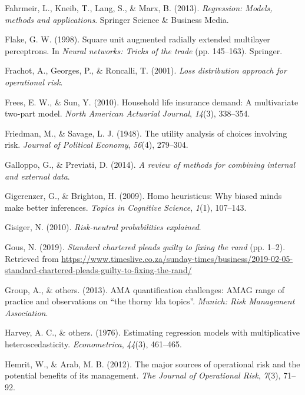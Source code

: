 \documentclass{DissertateUSU}
\begin{document}
\leavevmode\hypertarget{ref-fahrmeir2013regression}{}%
Fahrmeir, L., Kneib, T., Lang, S., \& Marx, B. (2013). \emph{Regression:
Models, methods and applications}. Springer Science \& Business Media.

\leavevmode\hypertarget{ref-flake1998square}{}%
Flake, G. W. (1998). Square unit augmented radially extended multilayer
perceptrons. In \emph{Neural networks: Tricks of the trade} (pp.
145--163). Springer.

\leavevmode\hypertarget{ref-frachot2001loss}{}%
Frachot, A., Georges, P., \& Roncalli, T. (2001). \emph{Loss
distribution approach for operational risk}.

\leavevmode\hypertarget{ref-frees2010household}{}%
Frees, E. W., \& Sun, Y. (2010). Household life insurance demand: A
multivariate two-part model. \emph{North American Actuarial Journal},
\emph{14}(3), 338--354.

\leavevmode\hypertarget{ref-friedman1948utility}{}%
Friedman, M., \& Savage, L. J. (1948). The utility analysis of choices
involving risk. \emph{Journal of Political Economy}, \emph{56}(4),
279--304.

\leavevmode\hypertarget{ref-galloppo2014review}{}%
Galloppo, G., \& Previati, D. (2014). \emph{A review of methods for
combining internal and external data}.

\leavevmode\hypertarget{ref-gigerenzer2009homo}{}%
Gigerenzer, G., \& Brighton, H. (2009). Homo heuristicus: Why biased
minds make better inferences. \emph{Topics in Cognitive Science},
\emph{1}(1), 107--143.

\leavevmode\hypertarget{ref-gisiger2010risk}{}%
Gisiger, N. (2010). \emph{Risk-neutral probabilities explained}.

\leavevmode\hypertarget{ref-suntimes2019}{}%
Gous, N. (2019). \emph{Standard chartered pleads guilty to fixing the
rand} (pp. 1--2). Retrieved from
\url{https://www.timeslive.co.za/sunday-times/business/2019-02-05-standard-chartered-pleads-guilty-to-fixing-the-rand/}

\leavevmode\hypertarget{ref-ama2013ama}{}%
Group, A., \& others. (2013). AMA quantification challenges: AMAG range
of practice and observations on ``the thorny lda topics''. \emph{Munich:
Risk Management Association}.

\leavevmode\hypertarget{ref-harvey1976estimating}{}%
Harvey, A. C., \& others. (1976). Estimating regression models with
multiplicative heteroscedasticity. \emph{Econometrica}, \emph{44}(3),
461--465.

\leavevmode\hypertarget{ref-hemrit2012major}{}%
Hemrit, W., \& Arab, M. B. (2012). The major sources of operational risk
and the potential benefits of its management. \emph{The Journal of
Operational Risk}, \emph{7}(3), 71--92.
\end{document}
